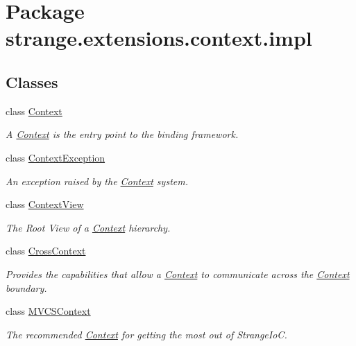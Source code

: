 \hypertarget{namespacestrange_1_1extensions_1_1context_1_1impl}{\section{Package strange.\-extensions.\-context.\-impl}
\label{namespacestrange_1_1extensions_1_1context_1_1impl}
}
\subsection*{Classes}
\begin{DoxyCompactItemize}
\item 
class \hyperlink{classstrange_1_1extensions_1_1context_1_1impl_1_1_context}{Context}
\begin{DoxyCompactList}\small\item\em A \hyperlink{classstrange_1_1extensions_1_1context_1_1impl_1_1_context}{Context} is the entry point to the binding framework. \end{DoxyCompactList}\item 
class \hyperlink{classstrange_1_1extensions_1_1context_1_1impl_1_1_context_exception}{Context\-Exception}
\begin{DoxyCompactList}\small\item\em An exception raised by the \hyperlink{classstrange_1_1extensions_1_1context_1_1impl_1_1_context}{Context} system. \end{DoxyCompactList}\item 
class \hyperlink{classstrange_1_1extensions_1_1context_1_1impl_1_1_context_view}{Context\-View}
\begin{DoxyCompactList}\small\item\em The Root View of a \hyperlink{classstrange_1_1extensions_1_1context_1_1impl_1_1_context}{Context} hierarchy. \end{DoxyCompactList}\item 
class \hyperlink{classstrange_1_1extensions_1_1context_1_1impl_1_1_cross_context}{Cross\-Context}
\begin{DoxyCompactList}\small\item\em Provides the capabilities that allow a \hyperlink{classstrange_1_1extensions_1_1context_1_1impl_1_1_context}{Context} to communicate across the \hyperlink{classstrange_1_1extensions_1_1context_1_1impl_1_1_context}{Context} boundary. \end{DoxyCompactList}\item 
class \hyperlink{classstrange_1_1extensions_1_1context_1_1impl_1_1_m_v_c_s_context}{M\-V\-C\-S\-Context}
\begin{DoxyCompactList}\small\item\em The recommended \hyperlink{classstrange_1_1extensions_1_1context_1_1impl_1_1_context}{Context} for getting the most out of Strange\-Io\-C. \end{DoxyCompactList}\end{DoxyCompactItemize}
